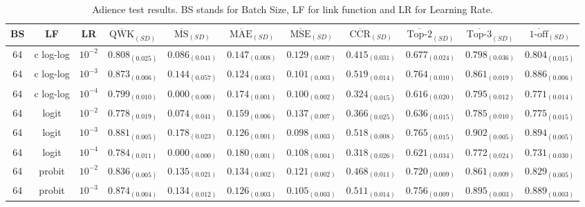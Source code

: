 \documentclass[journal]{IEEEtran}
\begin{document}
	\begin{table*}[!t]
		\caption{Adience test results. BS stands for Batch Size, LF for link function and LR for Learning Rate.}
		\label{table:AdienceTest}
		\footnotesize
		\centering
		\begin{tabular}{c@{\hskip 0.15cm}c@{\hskip 0.15cm}c|c@{\hskip 0.30cm}c@{\hskip 0.20cm}c@{\hskip 0.20cm}c@{\hskip 0.20cm}c@{\hskip 0.20cm}c@{\hskip 0.20cm}c@{\hskip 0.20cm}c}
			BS & LF & LR & $\overline{\text{QWK}}_{{(SD)}}$ & $\overline{\text{MS}}_{{(SD)}}$ & $\overline{\text{MAE}}_{{(SD)}}$ & $\overline{\text{MSE}}_{{(SD)}}$ & $\overline{\text{CCR}}_{{(SD)}}$ & $\overline{\text{Top-2}}_{{(SD)}}$ & $\overline{\text{Top-3}}_{{(SD)}}$ & $\overline{\text{1-off}}_{{(SD)}}$\\\hline
			64 & c log-log & $10^{-2}$ & $0.808_{(0.025)}$ & $0.086_{(0.041)}$ & $0.147_{(0.008)}$ & $0.129_{(0.007)}$ & $0.415_{(0.031)}$ & $0.677_{(0.024)}$ & $0.798_{(0.036)}$ & $0.804_{(0.015)}$\\
			64 & c log-log & $10^{-3}$ & $0.873_{(0.006)}$ & $0.144_{(0.057)}$ & $\mathbf{0.124_{(0.003)}}$ & $0.101_{(0.003)}$ & $\mathbf{0.519_{(0.014)}}$ & $\mathit{0.764_{(0.010)}}$ & $0.861_{(0.019)}$ & $0.886_{(0.006)}$\\
			64 & c log-log & $10^{-4}$ & $0.799_{(0.010)}$ & $0.000_{(0.000)}$ & $0.174_{(0.001)}$ & $0.100_{(0.002)}$ & $0.324_{(0.015)}$ & $0.616_{(0.020)}$ & $0.795_{(0.012)}$ & $0.771_{(0.014)}$\\
			64 & logit & $10^{-2}$ & $0.778_{(0.019)}$ & $0.074_{(0.041)}$ & $0.159_{(0.006)}$ & $0.137_{(0.007)}$ & $0.366_{(0.025)}$ & $0.636_{(0.015)}$ & $0.785_{(0.010)}$ & $0.775_{(0.015)}$\\
			64 & logit & $10^{-3}$ & $\mathbf{0.881_{(0.005)}}$ & $\mathit{0.178_{(0.023)}}$ & $\mathit{0.126_{(0.001)}}$ & $0.098_{(0.003)}$ & $\mathit{0.518_{(0.008)}}$ & $\mathbf{0.765_{(0.015)}}$ & $\mathbf{0.902_{(0.005)}}$ & $\mathbf{0.894_{(0.005)}}$\\
			64 & logit & $10^{-4}$ & $0.784_{(0.011)}$ & $0.000_{(0.000)}$ & $0.180_{(0.001)}$ & $0.108_{(0.004)}$ & $0.318_{(0.026)}$ & $0.621_{(0.034)}$ & $0.772_{(0.024)}$ & $0.731_{(0.030)}$\\
			64 & probit & $10^{-2}$ & $0.836_{(0.005)}$ & $0.135_{(0.021)}$ & $0.134_{(0.002)}$ & $0.121_{(0.002)}$ & $0.468_{(0.011)}$ & $0.720_{(0.009)}$ & $0.861_{(0.009)}$ & $0.829_{(0.005)}$\\
			64 & probit & $10^{-3}$ & $\mathit{0.874_{(0.004)}}$ & $0.134_{(0.012)}$ & $0.126_{(0.003)}$ & $0.105_{(0.003)}$ & $0.511_{(0.014)}$ & $0.756_{(0.009)}$ & $\mathit{0.895_{(0.003)}}$ & $\mathit{0.889_{(0.003)}}$\\

\end{tabular}
\end{table*}
\end{document}
